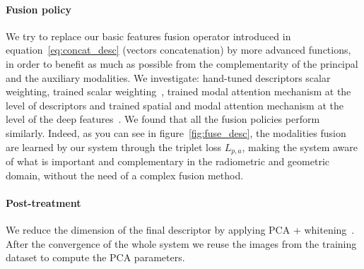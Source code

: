 \paragraph{Fusion policy}
We try to replace our basic features fusion operator introduced in equation~\ref{eq:concat_desc} (vectors concatenation) by more advanced functions, in order to benefit as much as possible from the complementarity of the principal and the auxiliary modalities. We investigate: hand-tuned descriptors scalar weighting, trained scalar weighting~\cite{Sizikova2016}, trained modal attention mechanism at the level of descriptors and trained spatial and modal attention mechanism at the level of the deep features~\cite{Seymour2018}. We found that all the fusion policies perform similarly. Indeed, as you can see in figure~\ref{fig:fuse_desc}, the modalities fusion are learned by our system through the triplet loss $L_{p, a}$, making the system aware of what is important and complementary in the radiometric and geometric domain, without the need of a complex fusion method.

\paragraph{Post-treatment}
We reduce the dimension of the final descriptor by applying PCA + whitening~\citep{Arandjelovic2017, Radenovic2016, Radenovic2017, Gordo2017}. After the convergence of the whole system we reuse the images from the training dataset to compute the PCA parameters.
